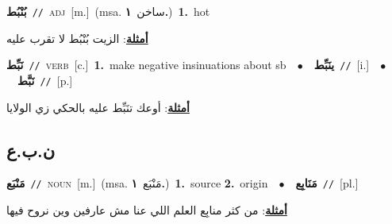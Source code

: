 \documentclass[10pt,a4paper,twoside]{article} %
\begin{document}
\begin{multicols}{2}
{{{{{{\setlength\topsep{0pt}\textbf{\foreignlanguage{arabic}{بُنْبُط}}\ {\color{gray}\texttt{//}\color{black}}\ \textsc{adj}\ [m.]\ \color{gray}(msa. \foreignlanguage{arabic}{ساخن}~\foreignlanguage{arabic}{\textbf{١.}})\color{black}\ \textbf{1.}~hot\  \begin{flushright}\color{gray}\foreignlanguage{arabic}{\textbf{\underline{\foreignlanguage{arabic}{أمثلة}}}: الزيت بُنْبُط لا تقرب عليه}\end{flushright}\color{black}} \vspace{2mm}

{\setlength\topsep{0pt}\textbf{\foreignlanguage{arabic}{نَبِّط}}\ {\color{gray}\texttt{//}\color{black}}\ \textsc{verb}\ [c.]\ \textbf{1.}~make negative insinuations about sb\ \ $\bullet$\ \ \setlength\topsep{0pt}\textbf{\foreignlanguage{arabic}{ينَبِّط}}\ {\color{gray}\texttt{//}\color{black}}\ [i.]\ \ $\bullet$\ \ \setlength\topsep{0pt}\textbf{\foreignlanguage{arabic}{نَبَّط}}\ {\color{gray}\texttt{//}\color{black}}\ [p.]\  \begin{flushright}\color{gray}\foreignlanguage{arabic}{\textbf{\underline{\foreignlanguage{arabic}{أمثلة}}}: أوعك تنَبِّط عليه بالحكي زي الولايا}\end{flushright}\color{black}} \vspace{2mm}

\vspace{-3mm}
\subsection*{\color{blue}\foreignlanguage{arabic}{ن.ب.ع}\color{blue}{}} 

{\setlength\topsep{0pt}\textbf{\foreignlanguage{arabic}{مَنْبَع}}\ {\color{gray}\texttt{//}\color{black}}\ \textsc{noun}\ [m.]\ \color{gray}(msa. \foreignlanguage{arabic}{مَنْبَع}~\foreignlanguage{arabic}{\textbf{١.}})\color{black}\ \textbf{1.}~source  \textbf{2.}~origin\ \ $\bullet$\ \ \setlength\topsep{0pt}\textbf{\foreignlanguage{arabic}{مَنَابِع}}\ {\color{gray}\texttt{//}\color{black}}\ [pl.]\  \begin{flushright}\color{gray}\foreignlanguage{arabic}{\textbf{\underline{\foreignlanguage{arabic}{أمثلة}}}: من كثر منابِع العلم اللي عنا مش عارفين وين نروح فيها}\end{flushright}\color{black}} \vspace{2mm}

}}}}}
\end{multicols}
\end{document}
